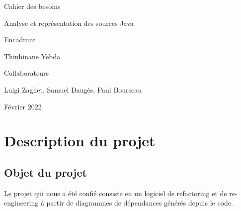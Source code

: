\documentclass{article}
\begin{document}
\begin{titlepage}
   \begin{center}
        \vspace{3cm}

        \Huge{Cahier des besoins}

        \vspace{0.5cm}
        \LARGE{Analyse et représentation des sources Java}
            
        \vspace{3 cm}
    
        \vspace{1 cm}
        \Large{Encadrant}
        
        \vspace{0.25cm}
        \large{Thinhinane Yebda}
    
        \vspace{3 cm}
        \Large{Collaborateurs}
        
        \vspace{0.25cm}
        \large{Luigi Zaghet, Samuel Daugès, Paul Bourseau}
       
        \vspace{3 cm}
        \Large{Février 2022}
        
        \vspace{0.25 cm}
       

       \vfill
    \end{center}
\end{titlepage}

\tableofcontents

\section{Description du projet}
\subsection{Objet du projet}
Le projet qui nous a été confié consiste en un logiciel de refactoring et de re-engineering à partir de diagrammes de dépendances générés depuis le code.
\end{document}
